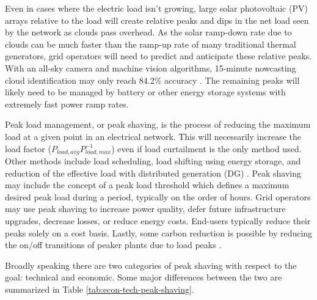 \documentclass[journal,article,submit,pdftex,moreauthors]{Definitions/mdpi}
\begin{document}
Even in cases where the electric load isn't growing, large solar photovoltaic (PV) arrays relative to the load will create relative peaks and dips in the net load seen by the network as clouds pass overhead. As the solar ramp-down rate due to clouds can be much faster than the ramp-up rate of many traditional thermal generators, grid operators will need to predict and anticipate these relative peaks. With an all-sky camera and machine vision algorithms, 15-minute nowcasting cloud identification may only reach 84.2\% accuracy \cite{Nespoli2022}. The remaining peaks will likely need to be managed by battery or other energy storage systems with extremely fast power ramp rates.


Peak load management, or peak shaving, is the process of reducing the maximum load at a given point in an electrical network. This will necessarily increase the load factor ($P_{load,avg} P_{load,max}^{-1}$) even if load curtailment is the only method used. Other methods include load scheduling, load shifting using energy storage, and reduction of the effective load with distributed generation (DG) \cite{Uddin2018}. Peak shaving may include the concept of a peak load threshold which defines a maximum desired peak load during a period, typically on the order of hours. Grid operators may use peak shaving to increase power quality, defer future infrastructure upgrades, decrease losses, or reduce energy costs. End-users typically reduce their peaks solely on a cost basis. Lastly, some carbon reduction is possible by reducing the on/off transitions of peaker plants due to load peaks \cite{Uddin2018}.

Broadly speaking there are two categories of peak shaving with respect to the goal: technical and economic. Some major differences between the two are summarized in Table \ref{tab:econ-tech-peak-shaving}.


\end{document}
